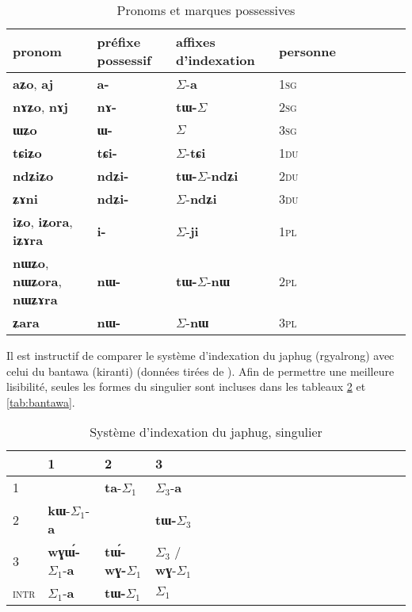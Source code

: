 \documentclass[oldfontcommands,oneside,a4paper,11pt]{article}
\newcommand{\ipa}[1]{{\phon\textbf{\mbox{#1}}}} %
\newcommand{\grise}[1]{\cellcolor{lightgray}\textbf{#1}}
\newcommand{\ra}{$\Sigma_1$}
\newcommand{\rc}{$\Sigma_3$}
\newcommand{\ro}{$\Sigma$}
\begin{document}
\begin{table}[H] \centering
\caption{Pronoms et marques possessives }\label{tab:pronoms}
\begin{tabular}{lllllllll} 
\toprule
pronom & préfixe possessif & affixes d'indexation& personne \\
\midrule
 \ipa{aʑo},    \ipa{aj} &	\ipa{a-}  &	\ro{}-\ipa{a}	& 1\textsc{sg} \\
\ipa{nɤʑo},  \ipa{nɤj} &	\ipa{nɤ-}  &	\ipa{tɯ-}\ro{} &		2\textsc{sg}\\
\ipa{ɯʑo}  &	\ipa{ɯ-}  &	\ro{} 	&	3\textsc{sg}\\
\midrule
\ipa{tɕiʑo}  &	\ipa{tɕi-}  &			\ro{}-\ipa{tɕi}	&	1\textsc{du} \\
\ipa{ndʑiʑo}  &	\ipa{ndʑi-}  &		\ipa{tɯ-}\ro{}-\ipa{ndʑi} &		2\textsc{du} \\	
\ipa{ʑɤni}  &	\ipa{ndʑi-}  &	\ro{}-\ipa{ndʑi} &		3\textsc{du} \\	
\midrule
\ipa{iʑo}, \ipa{iʑora},   \ipa{iʑɤra}   &	\ipa{i-}  &	\ro{}-\ipa{ji}	&		1\textsc{pl} \\
\ipa{nɯʑo}, \ipa{nɯʑora},   \ipa{nɯʑɤra}  &	\ipa{nɯ-}  &	\ipa{tɯ-}\ro{}-\ipa{nɯ} &			2\textsc{pl} \\
\ipa{ʑara}  &	\ipa{nɯ-}  &			\ro{}-\ipa{nɯ} &3\textsc{pl} \\
\bottomrule
\end{tabular}
\end{table}


 

Il est instructif de comparer le système d'indexation du japhug (rgyalrong) avec celui du bantawa (kiranti) (données tirées de \citealt{jacques10inverse, doornenbal09}). Afin de permettre une meilleure lisibilité, seules les formes du singulier sont incluses dans les tableaux \ref{tab:japhug} et \ref{tab:bantawa}.

 

\begin{table}[H]
\caption{Système d'indexation du japhug, singulier} \centering \label{tab:japhug}
\begin{tabular}{l|lllllllllllllllllll}
\toprule
&1 & 2 &3 &\\
\midrule
1 &\grise{}&\ipa{ta}-\ra{} & \rc{}-\ipa{a}	 \\
2 &\ipa{kɯ}-\ra{}-\ipa{a}	 &\grise{} &\ipa{tɯ-}\rc{} \\
3 &\ipa{wɣɯ́-}\ra{}-\ipa{a}&\ipa{tɯ́-wɣ-}\ra{}& \rc{} / \ipa{wɣ}-\ra{}\\
\midrule
\textsc{intr} & \ra{}-\ipa{a}&\ipa{tɯ-}\ra{}&\ra{} \\
\bottomrule
\end{tabular}
\end{table}
\end{document}
